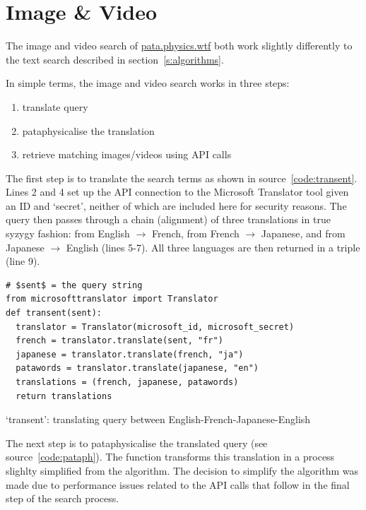 \section{Image \& Video}
\label{s:imgvid}

The image and video search of \url{pata.physics.wtf} both work slightly differently to the text search described in section~\ref{s:algorithms}.

In simple terms, the image and video search works in three steps:
\begin{enumerate}
  \item translate query
  \item pataphysicalise the translation
  \item retrieve matching images/videos using \ac{API} calls
\end{enumerate}

The first step is to translate the search terms as shown in source~\ref{code:transent}. Lines 2 and 4 set up the \ac{API} connection to the Microsoft Translator tool \autocite{TranslatorAPI} given an ID and `secret', neither of which are included here for security reasons. The query  then passes through a chain (alignment) of three translations in true syzygy fashion: from English $\to$ French, from French $\to$ Japanese, and from Japanese $\to$ English (lines 5-7). All three languages are then returned in a triple (line 9).

\begin{listing}
  \begin{verbatim}
# $sent$ = the query string
from microsofttranslator import Translator
def transent(sent):
  translator = Translator(microsoft_id, microsoft_secret)
  french = translator.translate(sent, "fr")
  japanese = translator.translate(french, "ja")
  patawords = translator.translate(japanese, "en")
  translations = (french, japanese, patawords)
  return translations
  \end{verbatim}
\caption[`transent' function]{`transent': translating query between English-French-Japanese-English}
\label{code:transent}
\end{listing}

The next step is to pataphysicalise the translated query (see source~\ref{code:pataph}). The  function transforms this translation in a process slighlty simplified from the  algorithm. The decision to simplify the algorithm was made due to performance issues related to the \ac{API} calls that follow in the final step of the search process. 


